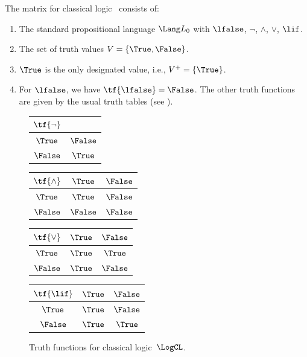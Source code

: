 \documentclass[../../../../include/open-logic-chapter]{subfiles}
\begin{document}
\begin{ex}
The matrix for classical logic~\LogCL{} consists of:
\begin{enumerate}
  \item The standard propositional language $\Lang L_0$ with
  $\lfalse$, $\lnot$, $\land$, $\lor$, $\lif$.
  \item The set of truth values $V = \{\True, \False\}$.
  \item $\True$ is the only designated value, i.e., $V^+ = \{\True\}$.
  \item For $\lfalse$, we have $\tf{\lfalse} = \False$. The other
  truth functions are given by the usual truth tables (see
  ).
\end{enumerate}
\begin{figure}
  \begin{center}
      \begin{tabular}{c|c} 
        $\tf{\lnot}$ & \\ 
        \hline  
        $\True$ & $\False$ \\ 
        $\False$ & $\True$ 
      \end{tabular}
      \quad
      \begin{tabular}{c|cc} 
        $\tf{\land}$ & $\True$ & $\False$ \\ 
        \hline 
        $\True$ & $\True$ & $\False$ \\ 
        $\False$ & $\False$ & $\False$ 
      \end{tabular}
      \quad
      \begin{tabular}{c|cc} 
        $\tf{\lor}$ & $\True$ & $\False$ \\ 
        \hline 
        $\True$ & $\True$ & $\True$ \\ 
        $\False$ & $\True$ & $\False$ 
      \end{tabular}
      \quad
      \begin{tabular}{c|cc} 
        $\tf{\lif}$ & $\True$ & $\False$ \\ 
        \hline 
        $\True$ & $\True$ & $\False$ \\ 
        $\False$ & $\True$ & $\True$ 
      \end{tabular}
    \end{center} 
    \caption{Truth functions for classical logic~$\LogCL$.}
  \end{figure}
  \end{ex}
\end{document}

